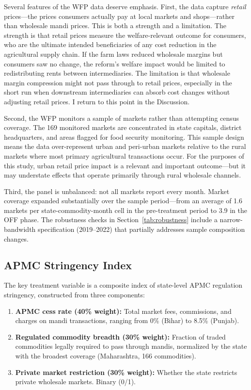 \documentclass[12pt]{article}
\begin{document}
Several features of the WFP data deserve emphasis. First, the data capture \emph{retail} prices---the prices consumers actually pay at local markets and shops---rather than wholesale mandi prices. This is both a strength and a limitation. The strength is that retail prices measure the welfare-relevant outcome for consumers, who are the ultimate intended beneficiaries of any cost reduction in the agricultural supply chain. If the farm laws reduced wholesale margins but consumers saw no change, the reform's welfare impact would be limited to redistributing rents between intermediaries. The limitation is that wholesale margin compression might not pass through to retail prices, especially in the short run when downstream intermediaries can absorb cost changes without adjusting retail prices. I return to this point in the Discussion.

Second, the WFP monitors a sample of markets rather than attempting census coverage. The 169 monitored markets are concentrated in state capitals, district headquarters, and areas flagged for food security monitoring. This sample design means the data over-represent urban and peri-urban markets relative to the rural markets where most primary agricultural transactions occur. For the purposes of this study, urban retail price impact is a relevant and important outcome---but it may understate effects that operate primarily through rural wholesale channels.

Third, the panel is unbalanced: not all markets report every month. Market coverage expanded substantially over the sample period---from an average of 1.6 markets per state-commodity-month cell in the pre-treatment period to 3.9 in the OFF phase. The robustness checks in Section~\ref{tab:robustness} include a narrow-bandwidth specification (2019--2022) that partially addresses sample composition changes.

\subsection{APMC Stringency Index}

The key treatment variable is a composite index of state-level APMC regulation stringency, constructed from three components:

\begin{enumerate}
    \item \textbf{APMC cess rate (40\% weight):} Total market fees, commissions, and charges on mandi transactions, ranging from 0\% (Bihar) to 8.5\% (Punjab).

    \item \textbf{Regulated commodity breadth (30\% weight):} Fraction of traded commodities legally required to pass through mandis, normalized by the state with the broadest coverage (Maharashtra, 166 commodities).

    \item \textbf{Private market restriction (30\% weight):} Whether the state restricts private wholesale markets. Binary (0/1).
\end{enumerate}
\end{document}
